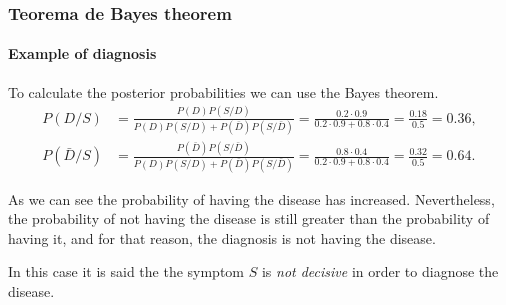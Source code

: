 \begin{frame}
\frametitle{Teorema de Bayes theorem}
\framesubtitle{Example of diagnosis}
To calculate the posterior probabilities we can use the Bayes theorem.
\begin{align*}
P(D/S) &= \frac{P(D)P(S/D)}{P(D)P(S/D)+P(\bar D)P(S/\bar D)} = \frac{0.2\cdot 0.9}{0.2\cdot 0.9 + 0.8\cdot 0.4} = \frac{0.18}{0.5}=0.36,\\
P(\bar D/S) &= \frac{P(\bar D)P(S/\bar D)}{P(D)P(S/D)+P(\bar D)P(S/\bar D)} = \frac{0.8\cdot 0.4}{0.2\cdot 0.9 + 0.8\cdot 0.4} = \frac{0.32}{0.5}=0.64.
\end{align*}

As we can see the probability of having the disease has increased. 
Nevertheless, the probability of not having the disease is still greater than the probability of having it, and for that
reason, the diagnosis is not having the disease. 

In this case it is said the the symptom $S$ is \emph{not decisive} in order to diagnose the disease.
\end{frame}

